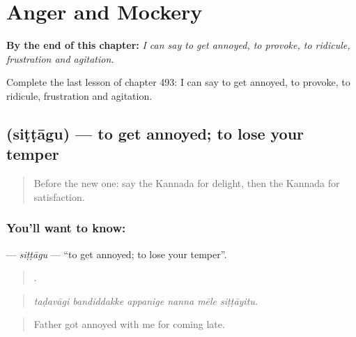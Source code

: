 
\chapter{Anger and Mockery}
\label{ch:ka-anger-and-mockery}

\begin{chapteropening}
\textbf{By the end of this chapter:} \emph{I can say to get annoyed, to provoke, to ridicule, frustration and agitation.}

Complete the last lesson of chapter 493: I can say to get annoyed, to provoke, to ridicule, frustration and agitation.
\end{chapteropening}

\section[\texorpdfstring{\kn{ಸಿಟ್ಟಾಗು} (siṭṭāgu)}{ಸಿಟ್ಟಾಗು (siṭṭāgu)}]{ (siṭṭāgu) — to get annoyed; to lose your temper}

\label{lesson:KA-C493-sittagu}



\begin{quote}
Before the new one: say the Kannada for delight, then the Kannada for satisfaction.
\end{quote}

\subsection*{You'll want to know: }
\textbf{} — \emph{siṭṭāgu} — \textquotedblleft{}to get annoyed; to lose your temper\textquotedblright{}.

\begin{quote}
     .
\end{quote}

\begin{quote}
\emph{taḍavāgi bandiddakke appanige nanna mēle siṭṭāyitu.}
\end{quote}

\begin{quote}
Father got annoyed with me for coming late.
\end{quote}

